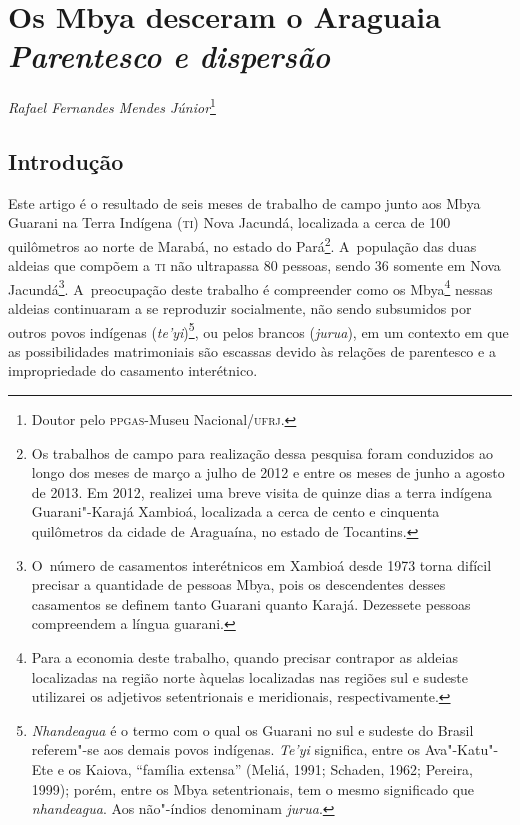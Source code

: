 \thispagestyle{empty}

\chapter*{Os Mbya desceram o Araguaia\\
\large{\emph{Parentesco e dispersão}}}


\begin{flushright}
\emph{Rafael Fernandes Mendes Júnior}\footnote{Doutor pelo \textsc{ppgas}-Museu
Nacional/\textsc{ufrj}.}
\end{flushright}
\medskip

\section{Introdução}

Este artigo é o resultado de seis meses de trabalho de
campo
junto aos Mbya
Guarani na Terra Indígena (\textsc{ti}) Nova Jacundá, localizada a cerca de 100
quilômetros ao norte de Marabá, no estado do Pará\footnote{Os trabalhos
de campo para realização dessa pesquisa foram conduzidos ao longo dos
meses de março a julho de 2012 e entre os meses de junho a agosto de
2013. Em 2012, realizei uma breve visita de quinze dias a terra
indígena Guarani"-Karajá Xambioá, localizada a cerca de cento e
cinquenta quilômetros da cidade de Araguaína, no estado de Tocantins.}.
A~população das duas aldeias que compõem a \textsc{ti} não ultrapassa 80
pessoas, sendo 36 somente em Nova Jacundá\footnote{O~número de
casamentos interétnicos em Xambioá desde 1973 torna difícil precisar a
quantidade de pessoas Mbya, pois os descendentes desses casamentos se
definem tanto Guarani quanto Karajá. Dezessete pessoas compreendem a
língua guarani.}. A~preocupação deste trabalho é compreender como os
Mbya\footnote{Para a economia deste trabalho, quando precisar contrapor
as aldeias localizadas na região norte àquelas localizadas nas regiões
sul e sudeste utilizarei os adjetivos setentrionais e meridionais,
respectivamente.} nessas aldeias continuaram a se reproduzir
socialmente, não sendo subsumidos por outros povos indígenas
(\emph{te’yi})\footnote{\emph{Nhandeagua} é o termo com o qual os Guarani no sul e
sudeste do Brasil referem"-se aos demais povos indígenas. \emph{Te’yi}
significa, entre os Ava"-Katu"-Ete e os Kaiova, ``família extensa'' (Meliá,
1991; Schaden, 1962; Pereira, 1999); porém, entre os Mbya setentrionais,
tem o mesmo significado que \emph{nhandeagua}. Aos não"-índios denominam
\emph{jurua}.}, ou pelos brancos (\emph{jurua}), em um contexto em que as
possibilidades matrimoniais são escassas devido às relações de
parentesco e a impropriedade do casamento interétnico.

